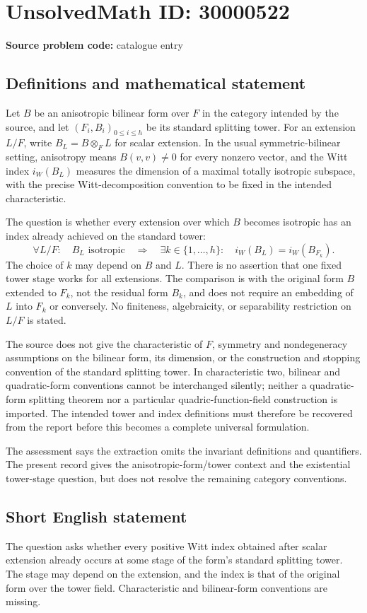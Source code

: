 \documentclass[11pt]{article}
\begin{document}
\section*{UnsolvedMath ID: 30000522}
\textbf{Source problem code:} catalogue entry
\subsection{Definitions and mathematical statement}
Let $B$ be an anisotropic bilinear form over $F$ in the category intended by the source, and let $(F_i,B_i)_{0\le i\le h}$ be its standard splitting tower. For an extension $L/F$, write $B_L=B\otimes_F L$ for scalar extension. In the usual symmetric-bilinear setting, anisotropy means $B(v,v)\ne0$ for every nonzero vector, and the Witt index $i_W(B_L)$ measures the dimension of a maximal totally isotropic subspace, with the precise Witt-decomposition convention to be fixed in the intended characteristic.

The question is whether every extension over which $B$ becomes isotropic has an index already achieved on the standard tower:
\[
 \forall L/F:\quad
 B_L\text{ isotropic}\quad\Longrightarrow\quad
 \exists k\in\{1,\ldots,h\}:\quad
 i_W(B_L)=i_W(B_{F_k}).
\]
The choice of $k$ may depend on $B$ and $L$. There is no assertion that one fixed tower stage works for all extensions. The comparison is with the original form $B$ extended to $F_k$, not the residual form $B_k$, and does not require an embedding of $L$ into $F_k$ or conversely. No finiteness, algebraicity, or separability restriction on $L/F$ is stated.

The source does not give the characteristic of $F$, symmetry and nondegeneracy assumptions on the bilinear form, its dimension, or the construction and stopping convention of the standard splitting tower. In characteristic two, bilinear and quadratic-form conventions cannot be interchanged silently; neither a quadratic-form splitting theorem nor a particular quadric-function-field construction is imported. The intended tower and index definitions must therefore be recovered from the report before this becomes a complete universal formulation.

The assessment says the extraction omits the invariant definitions and quantifiers. The present record gives the anisotropic-form/tower context and the existential tower-stage question, but does not resolve the remaining category conventions.
\subsection{Short English statement}
The question asks whether every positive Witt index obtained after scalar extension already occurs at some stage of the form's standard splitting tower. The stage may depend on the extension, and the index is that of the original form over the tower field. Characteristic and bilinear-form conventions are missing.
\end{document}
